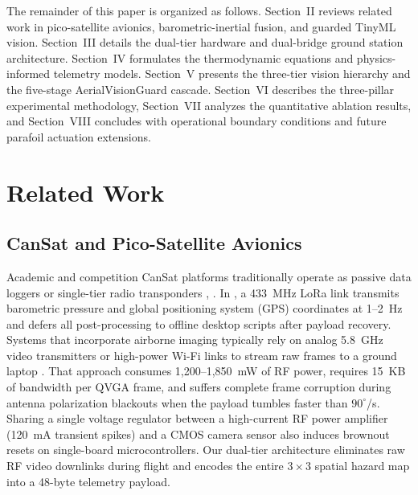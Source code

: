 \documentclass[conference]{IEEEtran}
\begin{document}
The remainder of this paper is organized as follows. Section~II reviews related work in pico-satellite avionics, barometric-inertial fusion, and guarded TinyML vision. Section~III details the dual-tier hardware and dual-bridge ground station architecture. Section~IV formulates the thermodynamic equations and physics-informed telemetry models. Section~V presents the three-tier vision hierarchy and the five-stage AerialVisionGuard cascade. Section~VI describes the three-pillar experimental methodology, Section~VII analyzes the quantitative ablation results, and Section~VIII concludes with operational boundary conditions and future parafoil actuation extensions.

\section{Related Work}

\subsection{CanSat and Pico-Satellite Avionics}
Academic and competition CanSat platforms traditionally operate as passive data loggers or single-tier radio transponders \cite{cansat_overview}, \cite{cansat_design_nasa}. In \cite{lora_telemetry}, a 433~MHz LoRa link transmits barometric pressure and global positioning system (GPS) coordinates at 1--2~Hz and defers all post-processing to offline desktop scripts after payload recovery. Systems that incorporate airborne imaging typically rely on analog 5.8~GHz video transmitters or high-power Wi-Fi links to stream raw frames to a ground laptop \cite{cansat_vision_parafoil}. That approach consumes 1,200--1,850~mW of RF power, requires 15~KB of bandwidth per QVGA frame, and suffers complete frame corruption during antenna polarization blackouts when the payload tumbles faster than $90^\circ$/s. Sharing a single voltage regulator between a high-current RF power amplifier (120~mA transient spikes) and a CMOS camera sensor also induces brownout resets on single-board microcontrollers. Our dual-tier architecture eliminates raw RF video downlinks during flight and encodes the entire $3 \times 3$ spatial hazard map into a 48-byte telemetry payload.
\end{document}
